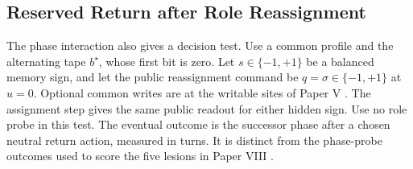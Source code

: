 \documentclass[11pt,a4paper]{article}
\begin{document}
\subsection{Reserved Return after Role Reassignment}

The phase interaction also gives a decision test. Use a common profile and the alternating tape $b^\star$, whose first bit is zero. Let $s\in\{-1,+1\}$ be a balanced memory sign, and let the public reassignment command be $q=\sigma\in\{-1,+1\}$ at $u=0$. Optional common writes are at the writable sites of Paper V \cite{paper5}. The assignment step gives the same public readout for either hidden sign. Use no role probe in this test. The eventual outcome is the successor phase after a chosen neutral return action, measured in turns. It is distinct from the phase-probe outcomes used to score the five lesions in Paper VIII \cite{paper8}.
\end{document}
